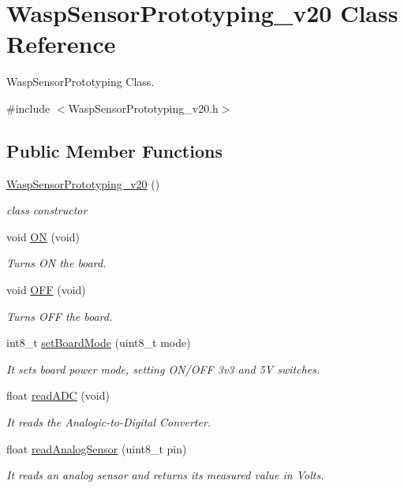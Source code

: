 \hypertarget{class_wasp_sensor_prototyping__v20}{}\section{Wasp\+Sensor\+Prototyping\+\_\+v20 Class Reference}
\label{class_wasp_sensor_prototyping__v20}


Wasp\+Sensor\+Prototyping Class.  




{\ttfamily \#include $<$Wasp\+Sensor\+Prototyping\+\_\+v20.\+h$>$}

\subsection*{Public Member Functions}
\begin{DoxyCompactItemize}
\item 
\hyperlink{class_wasp_sensor_prototyping__v20_a2c64aa3fb99ad909a1cc68a0444063e6}{Wasp\+Sensor\+Prototyping\+\_\+v20} ()
\begin{DoxyCompactList}\small\item\em class constructor \end{DoxyCompactList}\item 
void \hyperlink{class_wasp_sensor_prototyping__v20_ab6ddb4acbef1987395920e45c4a0325a}{ON} (void)
\begin{DoxyCompactList}\small\item\em Turns ON the board. \end{DoxyCompactList}\item 
void \hyperlink{class_wasp_sensor_prototyping__v20_a4a9dc7367bef8a4646532bc67c36b058}{O\+FF} (void)
\begin{DoxyCompactList}\small\item\em Turns O\+FF the board. \end{DoxyCompactList}\item 
int8\+\_\+t \hyperlink{class_wasp_sensor_prototyping__v20_a2613ede8780e32cbb1ffcbad1c53eff7}{set\+Board\+Mode} (uint8\+\_\+t mode)
\begin{DoxyCompactList}\small\item\em It sets board power mode, setting O\+N/\+O\+FF 3v3 and 5V switches. \end{DoxyCompactList}\item 
float \hyperlink{class_wasp_sensor_prototyping__v20_a700d9d00d2629fbb5f870d8283838b83}{read\+A\+DC} (void)
\begin{DoxyCompactList}\small\item\em It reads the Analogic-\/to-\/\+Digital Converter. \end{DoxyCompactList}\item 
float \hyperlink{class_wasp_sensor_prototyping__v20_aefedf8af5af2ed4c20e8f0da9bba45f4}{read\+Analog\+Sensor} (uint8\+\_\+t pin)
\begin{DoxyCompactList}\small\item\em It reads an analog sensor and returns its measured value in Volts. \end{DoxyCompactList}\end{DoxyCompactItemize}



